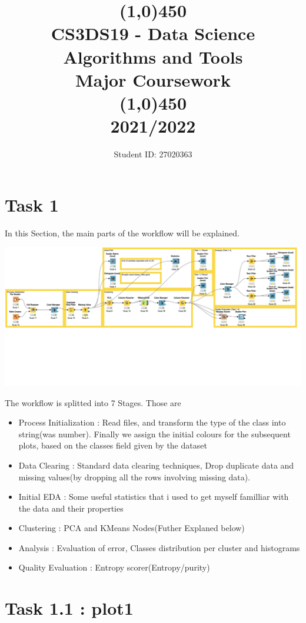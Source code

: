 \documentclass[12pt]{article}
\title{\line(1,0){450}\\ CS3DS19 - Data Science Algorithms and Tools \\ \large{Major Coursework }  \\\line(1,0){450} \\2021/2022}
\author{Student ID: 27020363}
\begin{document}
	\maketitle
	\pagebreak
	
	\section{Task 1}
		
		In this Section, the  main parts of the workflow will be explained.
		\begin{center}
			\includegraphics[scale=0.26]{res/workflow}
		\end{center}
		The workflow is splitted into 7 Stages. Those are
		\begin{itemize}
			\item Process Initialization : Read files, and transform the type of the class into string(was number). Finally we assign the initial colours for the subsequent plots, based on the classes field given by the dataset
			\item Data Clearing : Standard data clearing techniques, Drop duplicate data and missing values(by dropping all the rows involving missing data).
			\item Initial EDA : Some useful statistics that i used to get myself familliar with the data and their properties
			\item Clustering : PCA and KMeans Nodes(Futher Explaned below)
			\item Analysis : Evaluation of error, Classes distribution per cluster and histograms
			\item Quality Evaluation : Entropy scorer(Entropy/purity)
		\end{itemize}
	
	\section*{Task 1.1 : plot1}
	
\end{document}
